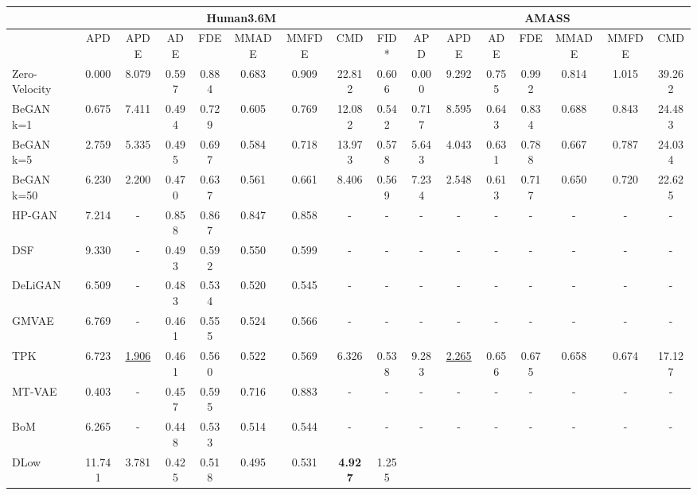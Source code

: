 \documentclass[10pt,twocolumn,letterpaper]{article}
\begin{document}
\setlength{\tabcolsep}{3pt}
\begin{table*}[t!]\renewcommand{\arraystretch}{0.9}
\footnotesize		
\centering
\begin{tabular}{l@{\hskip 3mm}cccccccc@{\hskip 2mm}|@{\hskip 2mm}ccccccc}
\toprule
& \multicolumn{8}{c}{Human3.6M \cite{ionescu2013h36m}} &  \multicolumn{7}{c}{AMASS \cite{mahmood2019amass}} \\

\midrule
& APD & APDE  & ADE  & FDE   & MMADE  & MMFDE & CMD  & FID* & APD & APDE & ADE  & FDE  & MMADE  & MMFDE & CMD  \\
\midrule
Zero-Velocity & 0.000 & 8.079 & 0.597 & 0.884 & 0.683 & 0.909 & 22.812 & 0.606 & 0.000 & 9.292 & 0.755 & 0.992 & 0.814 & 1.015 & 39.262\\
BeGAN k=1 & 0.675 & 7.411 & 0.494 & 0.729 & 0.605 & 0.769 & 12.082 & 0.542 & 0.717 & 8.595 & 0.643 & 0.834 & 0.688 & 0.843 & 24.483 \\
BeGAN k=5 & 2.759 & 5.335 & 0.495 & 0.697 & 0.584 & 0.718 & 13.973 & 0.578 & 5.643 & 4.043 & 0.631 & 0.788 & 0.667 & 0.787 & 24.034 \\
BeGAN k=50 & 6.230 & 2.200 & 0.470 & 0.637 & 0.561 & 0.661 & 8.406 & 0.569 & 7.234 & 2.548 & 0.613 & 0.717 & 0.650 & 0.720 & 22.625\\
\midrule
HP-GAN~\cite{barsoum2018hpgan} & 7.214 & - & 0.858 & 0.867 & 0.847 & 0.858 & - & - & -  & -  & -  & -  & -  & -  & -  \\
DSF~\cite{yuan2019dsf} & 9.330 & - & 0.493 & 0.592 & 0.550 & 0.599 & - & - & -  & -  & -  & -  & -  & -  & -  \\
DeLiGAN~\cite{gurumurthy2017deligan} & 6.509 & - & 0.483 & 0.534 & 0.520 & 0.545 & - & - & -  & -  & -  & -  & -  & -  & -  \\
GMVAE~\cite{dilokthanakul2016gmvae} & 6.769 & - & 0.461 & 0.555 & 0.524 & 0.566 & - & - & -  & -  & -  & -  & -  & -  & -  \\
TPK~\cite{walker2017theposeknows} & 6.723 & \underline{1.906} & 0.461 & 0.560 & 0.522 & 0.569 & 6.326 & 0.538 & 
9.283 & \underline{2.265} & 0.656 & 0.675 & 0.658 & 0.674 & 17.127\\
MT-VAE~\cite{yan2018mtvae} & 0.403 & - & 0.457 & 0.595 & 0.716 & 0.883 & - & - & -  & -  & -  & -  & -  & -  & -  \\
BoM~\cite{bhattacharyya2018bom} & 6.265 & - & 0.448 & 0.533 & 0.514 & 0.544 & - & - & -  & -  & -  & -  & -  & -  & -  \\
DLow~\cite{yuan2020dlow} & 11.741 & 3.781 & 0.425 & 0.518 & 0.495 & 0.531 & \textbf{4.927} & 1.255 & 

\end{tabular}
\end{table*}
\end{document}
